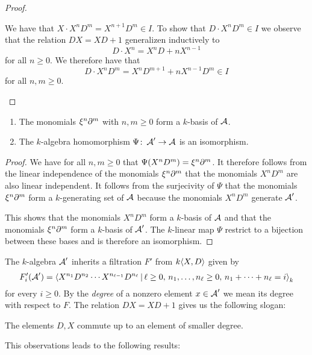 \begin{proof}
\begin{enumerate}
      We have that $X \cdot X^n D^m = X^{n+1} D^m \in I$.
      To show that $D \cdot X^n D^m \in I$ we observe that the relation $DX = XD + 1$ generalizen inductively to
      \begin{equation}
        \label{equation: weyl algebra more general formula}
          D \cdot X^n
        = X^n D + n X^{n-1}
      \end{equation}
      for all $n \geq 0$.
      We therefore have that
      \begin{equation}
      \label{equation: commutes op to smaller degree step 1}
            D \cdot X^n D^m
        =   X^n D^{m+1} + n X^{n-1} D^m
        \in I
      \end{equation}
      for all $n, m \geq 0$.
    \qedhere
  \end{enumerate}
\end{proof}


\begin{corollary}
  \leavevmode
  \begin{enumerate}
    \item
      The monomials $\xi^n \partial^m$ with $n, m \geq 0$ form a $k$-basis of $\operatorname{\mathcal{A}}$.
    \item
      The $k$-algebra homomorphism $\Psi \colon \operatorname{\mathcal{A}}' \to \operatorname{\mathcal{A}}$ is an isomorphism.
  \end{enumerate}
\end{corollary}


\begin{proof}
  We have for all $n, m \geq 0$ that $\Psi(X^n D^m) = \xi^n \partial^m$.
  It therefore follows from the linear independence of the monomials $\xi^n \partial^m$ that the monomials $X^n D^m$ are also linear independent.
  It follows from the surjecivity of $\Psi$ that the monomials $\xi^n \partial^m$ form a $k$-generating set of $\operatorname{\mathcal{A}}$ because the monomials $X^n D^m$ generate $\operatorname{\mathcal{A}}'$.
  
  This shows that the monomials $X^n D^m$ form a $k$-basis of $\operatorname{\mathcal{A}}$ and that the monomials $\xi^n \partial^m$ form a $k$-basis of $\operatorname{\mathcal{A}}'$.
  The $k$-linear map $\Psi$ restrict to a bijection between these bases and is therefore an isomorphism.
\end{proof}


\begin{fluff}
  The $k$-algebra $\operatorname{\mathcal{A}}'$ inherits a filtration $F'$ from $k\!\left\langle X,D \right\rangle$ given by
  \begin{equation}
    \label{equation: filtration of Weyl via quotient}
      F'_i(\weyl')
    = \gen{
        X^{n_1} D^{n_2} \dotsm X^{n_{\ell-1}} D^{n_\ell}
      \suchthat
        \ell \geq 0, \,
        n_1, \dotsc, n_\ell \geq 0, \,
        n_1 + \dotsb + n_\ell = i
      }_k
  \end{equation}
  for every $i \geq 0$.
  By the \emph{degree} of a nonzero element $x \in \operatorname{\mathcal{A}}'$ we mean its degree with respect to $F$.  
  The relation $D X = X D + 1$ gives us the following slogan:
  \begin{center}
    The elements $D, X$ commute up to an element of smaller degree.
  \end{center}
  This observations leads to the following results:
\end{fluff}


